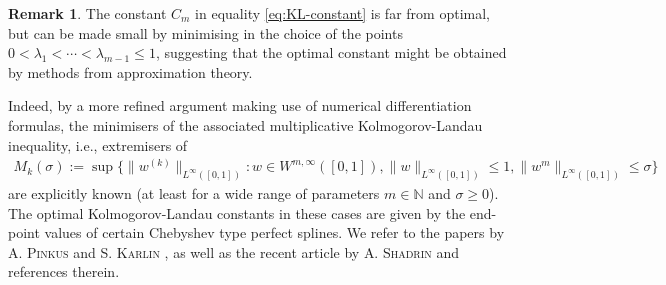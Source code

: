 \documentclass[11pt,a4paper,reqno]{amsart}
\theoremstyle{plain}
\theoremstyle{definition}
\newtheorem{remark}[proposition]{Remark}
\begin{document}
\begin{remark}
The constant $C_m$ in equality \eqref{eq:KL-constant} is far from optimal, but can be made small by minimising in the choice of the points $0<\lambda_1< \cdots< \lambda_{m-1}\leq 1$, suggesting that the optimal constant might be obtained by  methods from approximation theory.

Indeed, by a more refined argument making use of numerical differentiation formulas, the minimisers of the associated multiplicative Kolmogorov-Landau inequality, i.e., extremisers of
	\begin{align*}
		M_k(\sigma):=\sup\{ \|w^{(k)}\|_{L^{\infty}([0,1])}: w\in W^{m, \infty}([0,1]), \|w\|_{L^{\infty}([0,1])} \leq 1, \|w^{m}\|_{L^{\infty}([0,1])} \leq \sigma\}
	\end{align*}
	are explicitly known (at least for a wide range of parameters $m\in{\mathbb{N}}$ and $\sigma\geq 0$). The optimal Kolmogorov-Landau constants in these cases are given by the end-point values of certain Chebyshev type perfect splines. We refer to the papers by \textsc{A. Pinkus} \cite{Pin78} and \textsc{S. Karlin} \cite{Kar75}, as well as the recent article by \textsc{A. Shadrin} \cite{Sha14} and references therein.
\end{remark}
\end{document}
